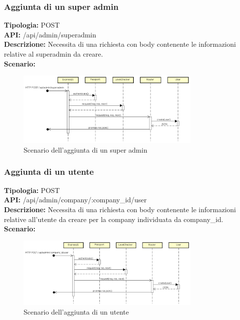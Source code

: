 \subsubsection{Aggiunta di un super admin}
\textbf{Tipologia:} POST \\
\textbf{API:} /api/admin/superadmin \\
\textbf{Descrizione:} Necessita di una richiesta con body contenente le informazioni relative al superadmin da creare. \\
\textbf{Scenario:} 
\begin{figure}[h]
\centering
\includegraphics[width=0.8\textwidth]{res/sections/backend/(POST)superadmin.png}
\caption{Scenario dell'aggiunta di un super admin}
\end{figure}

\subsubsection{Aggiunta di un utente}
\textbf{Tipologia:} POST \\
\textbf{API:} /api/admin/company/:company\_id/user \\
\textbf{Descrizione:} Necessita di una richiesta con body contenente le informazioni relative all'utente da creare per la company individuata da company\_id. \\
\textbf{Scenario:} 
\begin{figure}[h]
\centering
\includegraphics[width=0.8\textwidth]{res/sections/backend/(POST)userSA.png}
\caption{Scenario dell'aggiunta di un utente}
\end{figure}